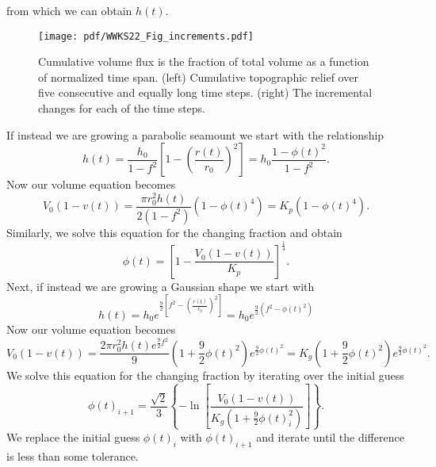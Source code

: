 from which we can obtain $h(t)$.
\begin{figure}
\centering
\texttt{[image: pdf/WWKS22\_Fig\_increments.pdf]}
\caption{Cumulative volume flux is the fraction of total volume as a function of normalized time span.
(left) Cumulative topographic relief over five consecutive and equally long time steps. (right) The incremental
changes for each of the time steps.}
\label{WWKS22_Fig_increments}
\end{figure}
If instead we are growing a parabolic seamount we start with the relationship
\begin{equation*}
h(t) = \frac{h_0}{1-f^2} \left [1 - \left (\frac{r(t)}{r_0} \right )^2 \right ] = h_0 \frac{1 - \phi(t)^2}{1 - f^2}.
\end{equation*}
Now our volume equation becomes
\begin{equation*}
V_0 (1 - v(t)) = \frac{\pi r_0^2 h(t)}{2 (1-f^2)} (1 - \phi(t)^4) = K_p (1 - \phi(t)^4).
\end{equation*}
Similarly, we solve this equation for the changing fraction and obtain
\begin{equation*}
\phi(t) = \left [1 - \frac{V_0 (1 - v(t))}{K_p} \right ]^{\frac{1}{4}}.
\end{equation*}
Next, if instead we are growing a Gaussian shape we start with
\begin{equation*}
h(t) = h_0 e^{\frac{9}{2} \left [ f^2 - \left (\frac{r(t)}{r_0} \right )^2 \right ]} = h_0 e^{\frac{9}{2}\left(f^2 - \phi(t)^2\right)}
\end{equation*}
Now our volume equation becomes
\begin{equation*}
V_0 (1 - v(t)) = \frac{2\pi r_0^2 h(t)e^{\frac{9}{2}f^2}}{9} \left (1 + \frac{9}{2}\phi(t)^2\right ) e^{\frac{9}{2}\phi(t)^2} = K_g (1 + \frac{9}{2}\phi(t)^2) e^{\frac{9}{2}\phi(t)^2}.
\end{equation*}
We solve this equation for the changing fraction by iterating over the initial guess
\begin{equation*}
\phi(t)_{i+1} = \frac{\sqrt{2}}{3} \left \{ - \ln \left [\frac{V_0 (1 - v(t))}{K_g \left (1 + \frac{9}{2}\phi(t)^2_i \right )} \right ] \right \}.
\end{equation*}
We replace the initial guess $\phi(t)_i$ with $\phi(t)_{i+1}$ and iterate until the difference
is less than some tolerance.

